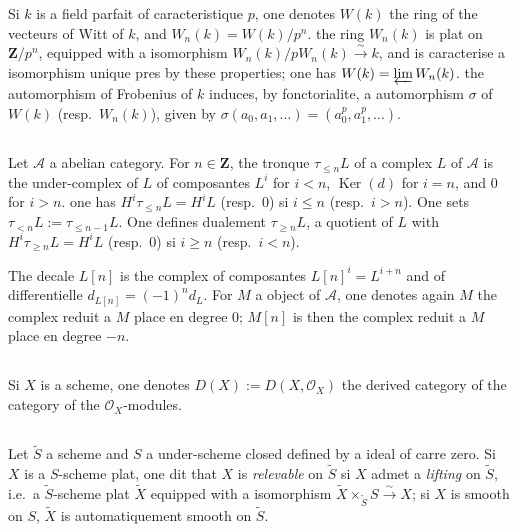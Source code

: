 \documentclass[12pt,a4paper]{article}
\theoremstyle{plain}
\theoremstyle{definition}
\theoremstyle{remark}
\DeclareMathOperator{\Ker}{Ker}
\newcommand{\cO}{\mathcal{O}}
\begin{document}
Si $k$ is a field parfait of caracteristique $p$, one denotes $W(k)$ the ring of the
vecteurs of Witt of $k$, and $W_n(k) = W(k)/p^n$. the ring $W_n(k)$ is plat on $\mathbf{Z}/p^n$, equipped with a isomorphism $W_n(k)/p W_n(k) \xrightarrow{\sim} k$, and is caracterise a isomorphism unique pres
by these properties; one has $W(k) = \varprojlim W_n(k)$. the automorphism of Frobenius of $k$
induces, by fonctorialite, a automorphism $\sigma$ of $W(k)$ (resp.~$W_n(k)$), given by
$\sigma(a_0, a_1, \ldots) = (a_0^p, a_1^p, \ldots)$.

\subsection{}

Let $\mathcal{A}$ a abelian category. For $n \in \mathbf{Z}$, the tronque $\tau_{\le n} L$ of a complex $L$
of $\mathcal{A}$ is the under-complex of $L$ of composantes $L^i$ for $i < n$, $\Ker(d)$ for $i = n$, and $0$
for $i > n$. one has $H^i \tau_{\le n} L = H^i L$ (resp.~$0$) si $i \le n$ (resp.~$i > n$). One sets $\tau_{< n} L := \tau_{\le n-1} L$.
One defines dualement $\tau_{\ge n} L$, a quotient of $L$ with $H^i \tau_{\ge n} L = H^i L$ (resp.~$0$) si $i \ge n$
(resp.~$i < n$).

The decale $L[n]$ is the complex of composantes $L[n]^i = L^{i+n}$ and of differentielle
$d_{L[n]} = (-1)^n d_L$. For $M$ a object of $\mathcal{A}$, one denotes again $M$ the complex reduit a $M$
place en degree $0$; $M[n]$ is then the complex reduit a $M$ place en degree $-n$.

\subsection{}

Si $X$ is a scheme, one denotes $D(X) := D(X, \cO_X)$ the derived category of the
category of the $\cO_X$-modules.

\subsection{}

Let $\tilde{S}$ a scheme and $S$ a under-scheme closed defined by a ideal of carre zero.
Si $X$ is a $S$-scheme plat, one dit that $X$ is \emph{relevable} on $\tilde{S}$ si $X$ admet a \emph{lifting}
on $\tilde{S}$, i.e.~a $\tilde{S}$-scheme plat $\tilde{X}$ equipped with a isomorphism $\tilde{X} \times_{\tilde{S}} S \xrightarrow{\sim} X$; si $X$ is smooth on
$S$, $\tilde{X}$ is automatiquement smooth on $\tilde{S}$.
\end{document}
